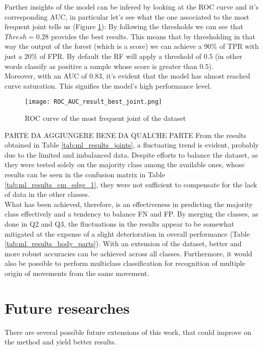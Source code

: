 Further insights of the model can be infered by looking at the ROC curve and it's corresponding AUC, in particular let's see what the one associated to the most frequent joint tells us (Figure \ref{fig:roc_auc_results}):
By following the thresholds we can see that $Thresh = 0.28$ provides the best results. This means that by thresholding in that way the output of the forest (which is a score) we can achieve a 90\% of TPR with just a 20\% of FPR.
By default the RF will apply a threshold of $0.5$ (in other words classify as positive a sample whose score is greater than $0.5$).\\

Moreover, with an AUC of $0.83$, it's evident that the model has almost reached curve saturation. This signifies the model's high performance level.

\begin{figure}
  \centering
  \texttt{[image: ROC\_AUC\_result\_best\_joint.png]}
  \caption{ROC curve of the most frequent joint of the dataset}
  \label{fig:roc_auc_results}
\end{figure}



PARTE DA AGGIUNGERE BENE DA QUALCHE PARTE
From the results obtained in Table \ref{tab:ml_results_joints}, a fluctuating trend is evident, probably due to the limited and imbalanced data. 
Despite efforts to balance the dataset, as they were tested solely on the majority class among the available ones, whose results can be seen in the confusion matrix in Table \ref{tab:ml_results_cm_edge_1}, 
they were not sufficient to compensate for the lack of data in the other classes. \\
What has been achieved, therefore, is an effectiveness in predicting the majority class effectively and a tendency to balance FN and FP. 
By merging the classes, as done in Q2 and Q3, the fluctuations in the results appear to be somewhat mitigated at the expense of a slight deterioration in overall performance (Table \ref{tab:ml_results_body_parts}).
With an extension of the dataset, better and more robust accuracies can be achieved across all classes.
Furthermore, it would also be possible to perform multiclass classification for recognition of multiple origin of movements from the same movement.\\





\clearpage


\section{Future researches}
\label{sec:future_researches}
There are several possible future extensions of this work, that could improve on the method and yield better results. \\

